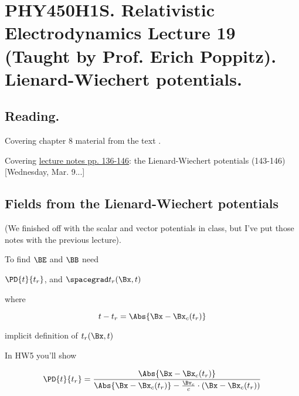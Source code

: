 
%

\chapter{PHY450H1S.  Relativistic Electrodynamics Lecture 19 (Taught by Prof. Erich Poppitz).  Lienard-Wiechert potentials.}
\label{chap:relativisticElectrodynamicsL19}
{}
\date{Mar 15, 2011}

\beginArtNoToc

\section{Reading.}

Covering chapter 8 material from the text \cite{landau1980classical}.

Covering \href{http://www.physics.utoronto.ca/~poppitz/epoppitz/PHY450_files/RelEMpp136-146.pdf}{lecture notes pp. 136-146}: the Lienard-Wiechert potentials (143-146) [Wednesday, Mar. 9...]

\section{Fields from the Lienard-Wiechert potentials}

(We finished off with the scalar and vector potentials in class, but I've put those notes with the previous lecture).

To find $\BE$ and $\BB$ need 

$\PD{t}{t_r}$, and $\spacegrad t_r(\Bx, t)$

where 

\begin{equation}\label{eqn:relativisticElectrodynamicsL19:10}
t - t_r = \Abs{\Bx - \Bx_c(t_r) }
\end{equation}

implicit definition of $t_r(\Bx, t)$

In HW5 you'll show

\begin{equation}\label{eqn:relativisticElectrodynamicsL19:30}
\PD{t}{t_r} = \frac{\Abs{\Bx - \Bx_c(t_r) }}{
\Abs{\Bx - \Bx_c(t_r) } - \frac{\Bv_c }{c} \cdot (\Bx - \Bx_c(t_r))}
\end{equation}

